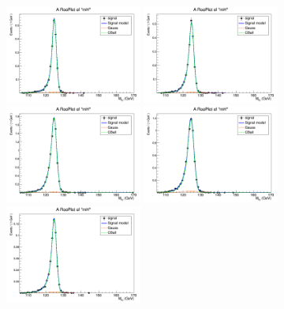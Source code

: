 \begin{figure}
	\begin{center}
		\includegraphics[width=0.40\textwidth]{fig/signal_fit/2016/sigfit_ele_ggF_1_125.png}
		\includegraphics[width=0.40\textwidth]{fig/signal_fit/2016/sigfit_ele_ggF_2_125.png}\\
		\includegraphics[width=0.40\textwidth]{fig/signal_fit/2016/sigfit_ele_ggF_3_125.png}
		\includegraphics[width=0.40\textwidth]{fig/signal_fit/2016/sigfit_ele_ggF_4_125.png}\\
		\includegraphics[width=0.40\textwidth]{fig/signal_fit/2016/sigfit_ele_VBF_501_125.png}

\end{center}
\end{figure}
